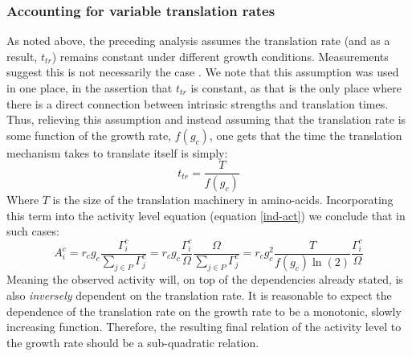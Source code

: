 \documentclass[a4page,notitlepage]{article}
\begin{document}
\subsubsection{Accounting for variable translation rates}
\label{nonconst-trans}
As noted above, the preceding analysis assumes the translation rate (and as a result, $t_{tr}$) remains constant under different growth conditions.
Measurements suggest this is not necessarily the case \parencite{Liang2000}.
We note that this assumption was used in one place, in the assertion that $t_{tr}$ is constant, as that is the only place where there is a direct connection between intrinsic strengths and translation times.
Thus, relieving this assumption and instead assuming that the translation rate is some function of the growth rate, $f(g_c)$, one gets that the time the translation mechanism takes to translate itself is simply:
\begin{equation}
t_{tr}=\frac{T}{f(g_c)}
\end{equation}
Where $T$ is the size of the translation machinery in amino-acids.
Incorporating this term into the activity level equation (equation \ref{ind-act}) we conclude that in such cases:
\begin{equation}
A^c_i=r_c g_c \frac{\Gamma^c_i}{\sum_{j\in P}\Gamma^c_j}=r_c g_c \frac{\Gamma^c_i}{\Omega}\frac{\Omega}{\sum_{j\in P}\Gamma^c_j}=r_c g_c^2\frac{T}{f(g_c)\ln(2)}\frac{\Gamma^c_i}{\Omega}
\end{equation}
Meaning the observed activity will, on top of the dependencies already stated, is also \emph{inversely} dependent on the translation rate.
It is reasonable to expect the dependence of the translation rate on the growth rate to be a monotonic, slowly increasing function.
Therefore, the resulting final relation of the activity level to the growth rate should be a sub-quadratic relation.
\end{document}
